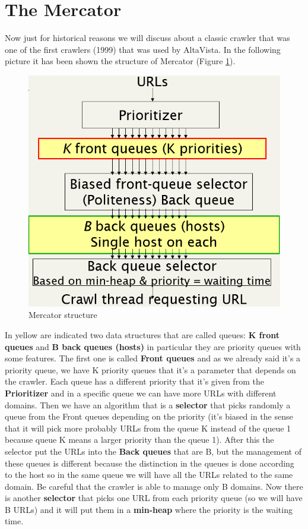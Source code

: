 \section{The Mercator}
Now just for historical reasons we will discuss about a classic crawler that was one of the first crawlers (1999) that was used by AltaVista.\newline
In the following picture it has been shown the structure of Mercator (Figure \ref{fig:mercator}).
\begin{figure}
    \centering
    \includegraphics[width=0.75\linewidth]{images/mercator.png}
    \caption{Mercator structure}
    \label{fig:mercator}
\end{figure}
In yellow are indicated two data structures that are called queues: \textbf{K front queues} and \textbf{B back queues (hosts)} in particular they are priority queues with some features. The first one is called \textbf{Front queues} and as we already said it's a priority queue, we have K priority queues that it's a parameter that depends on the crawler. Each queue has a different priority that it's given from the \textbf{Prioritizer} and in a specific queue we can have more URLs with different domains. Then we have an algorithm that is a \textbf{selector} that picks randomly a queue from the Front queues depending on the priority (it's biased in the sense that it will pick more probably URLs from the queue K instead of the queue 1 because queue K means a larger priority than the queue 1). After this the selector put the URLs into the \textbf{Back queues} that are B, but the management of these queues is different because the distinction in the queues is done according to the host so in the same queue we will have all the URLs related to the same domain. Be careful that the crawler is able to manage only B domains. Now there is another \textbf{selector} that picks one URL from each priority queue (so we will have B URLs) and it will put them in a \textbf{min-heap} where the priority is the waiting time.\newline
